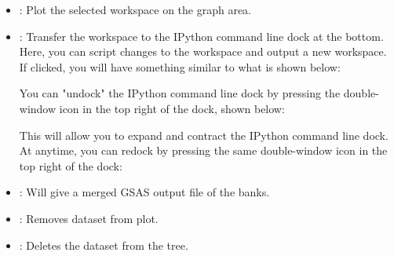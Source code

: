 \begin{itemize}

\item {}: Plot the selected workspace on the graph area.

\item {}: Transfer the workspace to the IPython command line dock at the bottom. Here, you can script changes to the workspace and output a new workspace. If clicked, you will have something similar to what is shown below:

\noindent{}

You can "undock" the IPython command line dock by pressing the double-window icon in the top right of the dock, shown below:

\noindent{} 

This will allow you to expand and contract the IPython command line dock. At anytime, you can redock by pressing the same double-window icon in the top right of the dock:

\noindent{}

\item {}: Will give a merged GSAS output file of the banks.
\item {}: Removes dataset from plot.
\item {}: Deletes the dataset from the  tree.

\end{itemize}



